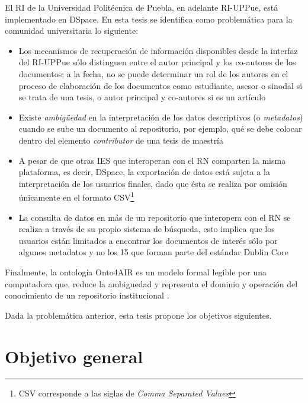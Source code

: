El RI de la Universidad Polit\'ecnica de Puebla, en adelante RI-UPPue, est\'a implementado en DSpace. En esta tesis se identifica como problem\'atica para la comunidad universitaria lo siguiente:

\begin{itemize}
\item Los mecanismos de recuperaci\'on de informaci\'on disponibles desde la interfaz del RI-UPPue s\'olo distinguen entre el autor principal y los co-autores de los documentos; a la fecha, no se puede determinar un rol de los autores en el proceso de elaboraci\'on de los documentos como estudiante, asesor o sinodal si se trata de una tesis, o autor principal y co-autores si es un art\'iculo

\item Existe \textit{ambig\"{u}edad} en la interpretaci\'on de los datos descriptivos (o \emph{metadatos}) cuando se sube un documento al repositorio, por ejemplo, qu\'e se debe colocar dentro del elemento \emph{contributor} de una tesis de maestr\'ia

\item A pesar de que otras IES que interoperan con el RN comparten la misma plataforma, es decir, DSpace, la exportaci\'on de datos est\'a sujeta a la interpretaci\'on de los usuarios finales, dado que \'esta se realiza por omisi\'on \'unicamente en el formato CSV\footnote{CSV corresponde a las siglas de \emph{Comma Separated Values}}

\item La consulta de datos en m\'as de un repositorio que interopera con el RN se realiza a trav\'es de su propio sistema de b\'usqueda, esto implica que los usuarios est\'an limitados a encontrar los documentos de inter\'es s\'olo por algunos metadatos y no los 15 que forman parte del est\'andar Dublin Core \cite{DublinCore}

\end{itemize}

Finalmente, la ontolog\'ia Onto4AIR es un modelo formal legible por una computadora que, reduce la ambiguedad y representa el dominio y operaci\'on del conocimiento de un repositorio institucional \cite{representacionSemantica}.

Dada la problem\'atica anterior, esta tesis propone los objetivos siguientes. 

\section{Objetivo general} 

